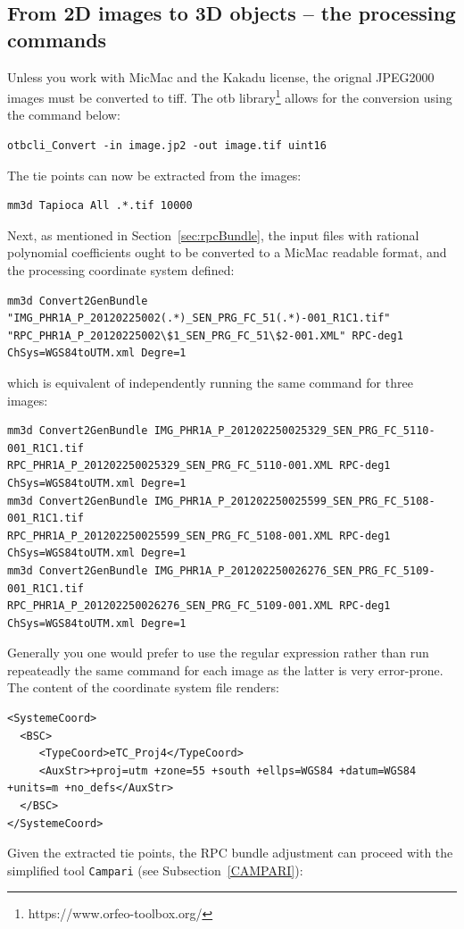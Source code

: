 \subsection{From 2D images to 3D objects -- the processing commands}
%
Unless you work with MicMac and the Kakadu license, the orignal JPEG2000 images must be  converted to tiff. The otb library\footnote{https://www.orfeo-toolbox.org/} allows for the conversion using the command below: 
\begin{verbatim}
otbcli_Convert -in image.jp2 -out image.tif uint16
\end{verbatim}
%
The tie points can now be extracted from the images:
\begin{verbatim}
mm3d Tapioca All .*.tif 10000  
\end{verbatim}
%
Next, as mentioned in Section~\ref{sec:rpcBundle}, the input files with rational polynomial coefficients ought to be converted to a MicMac readable format, and the processing coordinate system defined:
\begin{verbatim}
mm3d Convert2GenBundle "IMG_PHR1A_P_20120225002(.*)_SEN_PRG_FC_51(.*)-001_R1C1.tif"
"RPC_PHR1A_P_20120225002\$1_SEN_PRG_FC_51\$2-001.XML" RPC-deg1 ChSys=WGS84toUTM.xml Degre=1
\end{verbatim}
%
which is equivalent of independently running the same command for three images:
%
\begin{verbatim} 
mm3d Convert2GenBundle IMG_PHR1A_P_201202250025329_SEN_PRG_FC_5110-001_R1C1.tif
RPC_PHR1A_P_201202250025329_SEN_PRG_FC_5110-001.XML RPC-deg1 ChSys=WGS84toUTM.xml Degre=1
mm3d Convert2GenBundle IMG_PHR1A_P_201202250025599_SEN_PRG_FC_5108-001_R1C1.tif
RPC_PHR1A_P_201202250025599_SEN_PRG_FC_5108-001.XML RPC-deg1 ChSys=WGS84toUTM.xml Degre=1
mm3d Convert2GenBundle IMG_PHR1A_P_201202250026276_SEN_PRG_FC_5109-001_R1C1.tif
RPC_PHR1A_P_201202250026276_SEN_PRG_FC_5109-001.XML RPC-deg1 ChSys=WGS84toUTM.xml Degre=1
\end{verbatim}
%
Generally you one would prefer to use the regular expression rather than run repeateadly the same command for each image as the latter is very error-prone. The content of the coordinate system file renders:
\begin{verbatim}
<SystemeCoord>
  <BSC>
     <TypeCoord>eTC_Proj4</TypeCoord>
     <AuxStr>+proj=utm +zone=55 +south +ellps=WGS84 +datum=WGS84 +units=m +no_defs</AuxStr>
  </BSC>
</SystemeCoord> 
\end{verbatim}
%
Given the extracted tie points, the RPC bundle adjustment can proceed with the simplified tool {\tt Campari} (see Subsection~\ref{CAMPARI}):
